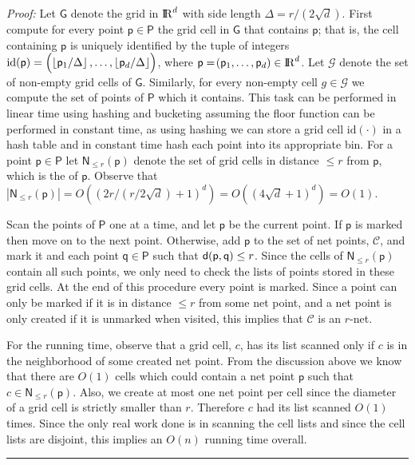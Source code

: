 \ifx\STACS\undefined \documentclass[12pt]{article}\else \documentclass[runningheads,a4paper]{llncs}
\newcommand{\emphi}[1]{\emphic{#1}{#1}}
\newcommand{\pth}[2][\!]{#1\left({#2}\right)}
\renewcommand{\Re}{{\rm I\!\hspace{-0.025em} R}}
\newcommand{\MakeSBig}{\rule[0.0cm]{0.0cm}{0.38cm}}
\newcommand{\myqedsymbol}{\rule{2mm}{2mm}}
\newcommand{\cardin}[1]{\left| {#1} \right|}
\newcommand{\floor}[1]{\left\lfloor {#1} \right\rfloor}
\newcommand{\pnt}{{\mathsf{p}}}\newcommand{\pntA}{{\mathsf{q}}}\newcommand{\pntB}{{\mathsf{s}}}
\newcommand{\PntSet}{\mathsf{P}}\newcommand{\PntSetA}{\mathsf{W}}
\newcommand{\cset}{\mathcal{C}}
\newcommand{\gset}{\mathcal{G}}
\newcommand{\ProofFake}[1]{ 
   {\emph{Proof:}} #1
   \hfill{\myqedsymbol}
}
\newcommand{\Grid}{\mathsf{G}}
\begin{document}
\newcommand{\GridNbrChar}{\mathsf{N}}
\newcommand{\GridNbr}[2]{\mathsf{N}_{\leq #2}\pth{#1}}
\newcommand{\GridNbrCell}[1]{\mathsf{N}\pth{#1}}
\newcommand{\gidX}[1]{\mathrm{id}\pth{#1}} 
\ProofFake{Let $\Grid$ denote the grid in $\Re^d$ with side length $\Delta =
    r/\pth{2\sqrt{d}}$.  First compute for every point $\pnt \in
    \PntSet$ the grid cell in $\Grid$ that contains $\pnt$; that is,
    the cell containing $\pnt$ is uniquely identified by the tuple of
    integers $\gidX{\pnt} = \pth[]{\MakeSBig\! \floor{\pnt_1/\Delta},
       \ldots, \floor{\pnt_d/\Delta}}$, where $\pnt = \pth{\pnt_1,
       \ldots, \pnt_d} \in \Re^d$.  Let $\gset$ denote the set of
    non-empty grid cells of $\Grid$.  Similarly, for every non-empty
    cell $g \in \gset$ we compute the set of points of $\PntSet$ which
    it contains.  This task can be performed in linear time using
    hashing and bucketing assuming the floor function can be performed
    in constant time, as using hashing we can store a grid cell
    $\gidX{\cdot}$ in a hash table and in constant time hash each
    point into its appropriate bin.  For a point $\pnt \in \PntSet$
    let $\GridNbr{\pnt}{r}$ denote the set of grid cells in distance
    $\leq r$ from $\pnt$, which is the \emphi{neighborhood} of $\pnt$.
    Observe that $\cardin{\GridNbr{\pnt}{r}} =
    O\pth{(2r/(r/2\sqrt{d})+1)^d} = O\pth{(4\sqrt{d}+1)^d } = O(1)$.
   
    Scan the points of $\PntSet$ one at a time, and let $\pnt$ be the
    current point.  If $\pnt$ is marked then move on to the next
    point.  Otherwise, add $\pnt$ to the set of net points, $\cset$,
    and mark it and each point $\pntA \in \PntSet$ such that
    $\distX{\pnt}{\pntA} \leq r$.  Since the cells of $\GridNbr{\pnt}{r}$
    contain all such points, we only need to check the lists of points
    stored in these grid cells.  At the end of this procedure every
    point is marked.  Since a point can only be marked if it is in
    distance $\leq r$ from some net point, and a net point is only
    created if it is unmarked when visited, this implies that $\cset$
    is an $r$-net.
   
    For the running time, observe that a grid cell, $c$, has its list
    scanned only if $c$ is in the neighborhood of some created net
    point.  From the discussion above we know that there are $O(1)$
    cells which could contain a net point $\pnt$ such that $c\in
    \GridNbr{\pnt}{r}$.  Also, we create at most one net point per
    cell since the diameter of a grid cell is strictly smaller than
    $r$.  Therefore $c$ had its list scanned $O(1)$ times.  Since the
    only real work done is in scanning the cell lists and since the
    cell lists are disjoint, this implies an $O(n)$ running time
    overall.
}
\bigskip
\end{document}

